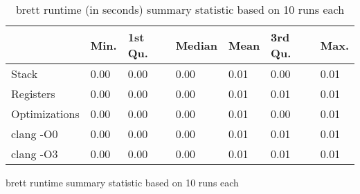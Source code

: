 \begin{table}[h!]
\centering
\begin{tabular}{p{}p{}p{}p{}p{}p{}p{}}
  \hline
 & Min. & 1st Qu. & Median & Mean & 3rd Qu. & Max. \\ 
  \hline
Stack & 0.00 & 0.00 & 0.00 & 0.01 & 0.00 & 0.01 \\ 
  Registers & 0.00 & 0.00 & 0.00 & 0.01 & 0.01 & 0.01 \\ 
  Optimizations & 0.00 & 0.00 & 0.00 & 0.01 & 0.00 & 0.01 \\ 
  clang -O0 & 0.00 & 0.00 & 0.00 & 0.01 & 0.01 & 0.01 \\ 
  clang -O3 & 0.00 & 0.00 & 0.00 & 0.01 & 0.01 & 0.01 \\ 
   \hline
\end{tabular}
\caption{brett runtime summary statistic based on 10 runs each}
\caption{brett runtime (in seconds) summary statistic based on 10 runs each}
\end{table}
